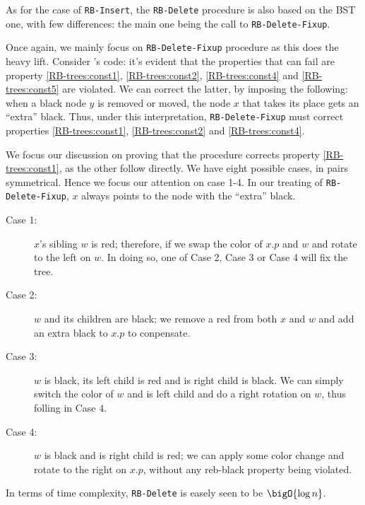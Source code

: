 \documentclass{subfiles}
\begin{document}
    As for the case of \lstinline{RB-Insert}, 
        the \lstinline{RB-Delete} procedure is also based on the BST one,
        with few differences: the main one being the call to \lstinline{RB-Delete-Fixup}.

    
    Once again, we mainly focus on \lstinline{RB-Delete-Fixup} procedure 
        as this does the heavy lift. Consider 's code: 
        it's evident that the properties that can fail are property 
        \ref{RB-trees:const1}, \ref{RB-trees:const2}, \ref{RB-trees:const4} and 
        \ref{RB-trees:const5} are violated. We can correct the latter,
        by imposing the following: when a black node \(y\) is removed or moved, 
        the node \(x\) that takes its place gets an ``extra'' black.
        Thus, under this interpretation, \lstinline{RB-Delete-Fixup} must correct 
        properties \ref{RB-trees:const1}, \ref{RB-trees:const2} and \ref{RB-trees:const4}.

    We focus our discussion on proving that the procedure corrects property \ref{RB-trees:const1},
        as the other follow directly. We have eight possible cases, in pairs symmetrical.
        Hence we focus our attention on case 1-4. In our treating of \lstinline{RB-Delete-Fixup},
        \(x\) always points to the node with the ``extra'' black.

    \begin{description}
        \item [Case 1:] \(x\)'s sibling \(w\) is red;
            therefore, if we swap the color of \(x.p\) and \(w\) and rotate to the left on 
            \(w\). In doing so, one of Case 2, Case 3 or Case 4 will fix the tree. 

        \item [Case 2:] \(w\) and its children are black;
            we remove a red from both \(x\) and \(w\) and add an extra black to \(x.p\) 
            to conpensate.

        \item [Case 3:] \(w\) is black, its left child is red and is right child is black. 
            We can simply switch the color of \(w\) and is left child and do a right rotation on 
            \(w\), thus folling in Case 4.

        \item [Case 4:] \(w\) is black and is right child is red;
            we can apply some color change and rotate to the right on \(x.p\),
            without any reb-black property being violated.
    \end{description}

    In terms of time complexity, \lstinline{RB-Delete} is easely seen to be \(\bigO{\log n}\).
    
\end{document}
